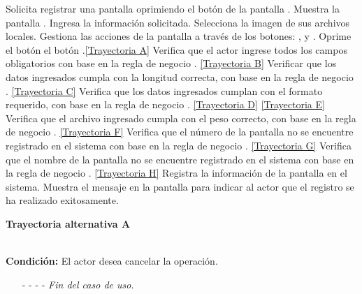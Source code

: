 	\begin{UCtrayectoria}
		\UCpaso[\UCactor] Solicita registrar una pantalla oprimiendo el botón  de la pantalla .
		\UCpaso[\UCsist] Muestra la pantalla . \label{CU11.1-P5}
		\UCpaso[\UCactor] Ingresa la información solicitada. \label{CU11.1-P3}
		\UCpaso[\UCactor] Selecciona la imagen de sus archivos locales. \label{CU11.1-P4}
		\UCpaso[\UCactor] Gestiona las acciones de la pantalla a través de los botones: , \editar y \eliminar. 
		\UCpaso[\UCactor] Oprime el botón el botón .\hyperlink{CU11-1:TAA}{[Trayectoria A]}
		\UCpaso[\UCsist] Verifica que el actor ingrese todos los campos obligatorios con base en la regla de negocio . \hyperlink{CU11-1:TAB}{[Trayectoria B]}
		\UCpaso[\UCsist] Verificar que los datos ingresados cumpla con la longitud correcta, con base en la regla de negocio . \hyperlink{CU11-1:TAC}{[Trayectoria C]}
		\UCpaso[\UCsist] Verifica que los datos ingresados cumplan con el formato requerido, con base en la regla de negocio . \hyperlink{CU11-1:TAD}{[Trayectoria D]} \hyperlink{CU11-1:TAC}{[Trayectoria E]}
		\UCpaso[\UCsist] Verifica que el archivo ingresado cumpla con el peso correcto, con base en la regla de negocio . \hyperlink{CU11-1:TAF}{[Trayectoria F]}
		\UCpaso[\UCsist] Verifica que el número de la pantalla no se encuentre registrado en el sistema con base en la regla de negocio . \hyperlink{CU11-1:TAG}{[Trayectoria G]}
		\UCpaso[\UCsist] Verifica que el nombre de la pantalla no se encuentre registrado en el sistema con base en la regla de negocio . \hyperlink{CU11-1:TAH}{[Trayectoria H]}
		\UCpaso[\UCsist] Registra la información de la pantalla en el sistema.
		\UCpaso[\UCsist] Muestra el mensaje  en la pantalla  para indicar al actor que el registro se ha realizado exitosamente.
	\end{UCtrayectoria}		
\hypertarget{CU11-1:TAA}{\textbf{Trayectoria alternativa A}}\\
\noindent \textbf{Condición:} El actor desea cancelar la operación.
\begin{enumerate}
	\UCpaso[\UCactor] Solicita cancelar la operación oprimiendo el botón  de la pantalla .
	\UCpaso[\UCsist] Muestra la pantalla .
	\item[- -] - - {\em {Fin del caso de uso}}.%
\end{enumerate}
